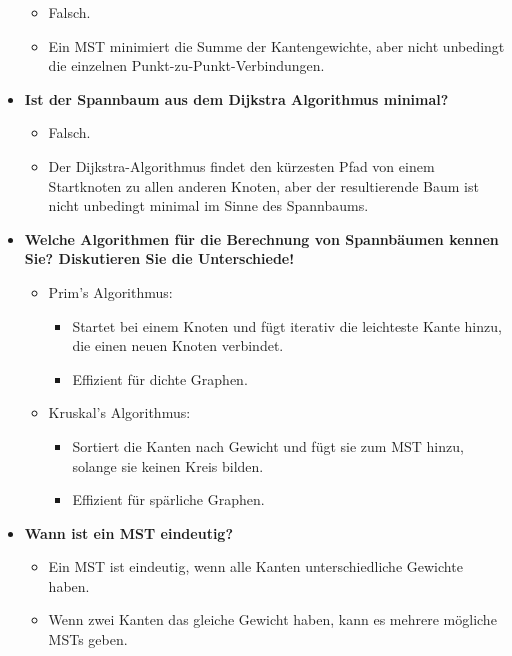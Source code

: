 \documentclass[12pt]{scrartcl}
\begin{document}
\begin{itemize}
\begin{itemize}
              \item Falsch.
              \item Ein MST minimiert die Summe der Kantengewichte, aber nicht unbedingt die einzelnen Punkt-zu-Punkt-Verbindungen.
          \end{itemize}
    \item \textbf{Ist der Spannbaum aus dem Dijkstra Algorithmus minimal?}
          \begin{itemize}
              \item Falsch.
              \item Der Dijkstra-Algorithmus findet den kürzesten Pfad von einem Startknoten zu allen anderen Knoten, aber der resultierende Baum ist nicht unbedingt minimal im Sinne des Spannbaums.
          \end{itemize}
    \item \textbf{Welche Algorithmen für die Berechnung von Spannbäumen kennen Sie? Diskutieren Sie die Unterschiede!}
          \begin{itemize}
              \item Prim's Algorithmus:
                    \begin{itemize}
                        \item Startet bei einem Knoten und fügt iterativ die leichteste Kante hinzu, die einen neuen Knoten verbindet.
                        \item Effizient für dichte Graphen.
                    \end{itemize}
              \item Kruskal's Algorithmus:
                    \begin{itemize}
                        \item Sortiert die Kanten nach Gewicht und fügt sie zum MST hinzu, solange sie keinen Kreis bilden.
                        \item Effizient für spärliche Graphen.
                    \end{itemize}
          \end{itemize}
    \item \textbf{Wann ist ein MST eindeutig?}
          \begin{itemize}
              \item Ein MST ist eindeutig, wenn alle Kanten unterschiedliche Gewichte haben.
              \item Wenn zwei Kanten das gleiche Gewicht haben, kann es mehrere mögliche MSTs geben.
          \end{itemize}

\end{itemize}
\end{document}
